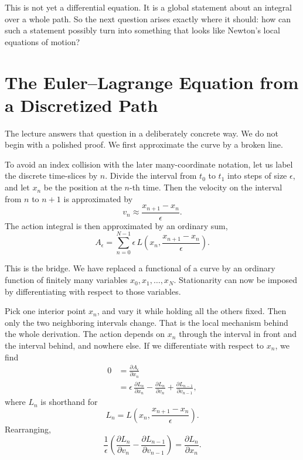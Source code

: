 This is not yet a differential equation. It is a global statement about an integral over a whole path. So the next question arises exactly where it should: how can such a statement possibly turn into something that looks like Newton's local equations of motion?

\section{The Euler--Lagrange Equation from a Discretized Path}

The lecture answers that question in a deliberately concrete way. We do not begin with a polished proof. We first approximate the curve by a broken line.

To avoid an index collision with the later many-coordinate notation, let us label the discrete time-slices by \(n\). Divide the interval from \(t_0\) to \(t_1\) into steps of size \(\epsilon\), and let \(x_n\) be the position at the \(n\)-th time. Then the velocity on the interval from \(n\) to \(n+1\) is approximated by
\begin{equation}
v_n \approx \frac{x_{n+1}-x_n}{\epsilon}.
\end{equation}
The action integral is then approximated by an ordinary sum,
\begin{equation}
A_\epsilon=\sum_{n=0}^{N-1}\epsilon\,L\!\left(x_n,\frac{x_{n+1}-x_n}{\epsilon}\right).
\end{equation}

This is the bridge. We have replaced a functional of a curve by an ordinary function of finitely many variables \(x_0,x_1,\dots,x_N\). Stationarity can now be imposed by differentiating with respect to those variables.

Pick one interior point \(x_n\), and vary it while holding all the others fixed. Then only the two neighboring intervals change. That is the local mechanism behind the whole derivation. The action depends on \(x_n\) through the interval in front and the interval behind, and nowhere else. If we differentiate with respect to \(x_n\), we find
\begin{align}
0
&=\frac{\partial A_\epsilon}{\partial x_n} \\
&=\epsilon\,\frac{\partial L_n}{\partial x_n}
-\frac{\partial L_n}{\partial v_n}
+\frac{\partial L_{n-1}}{\partial v_{n-1}},
\end{align}
where \(L_n\) is shorthand for
\[
L_n=L\!\left(x_n,\frac{x_{n+1}-x_n}{\epsilon}\right).
\]
Rearranging,
\begin{equation}
\frac{1}{\epsilon}
\left(
\frac{\partial L_n}{\partial v_n}
-
\frac{\partial L_{n-1}}{\partial v_{n-1}}
\right)
=
\frac{\partial L_n}{\partial x_n}.
\end{equation}

